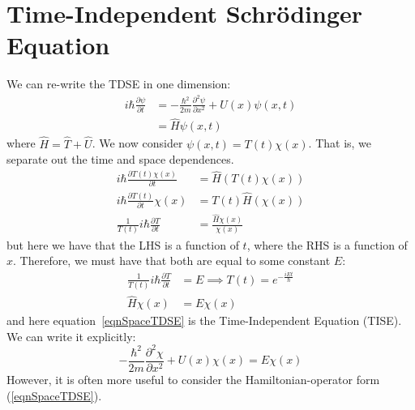 \documentclass[../Main.tex]{subfiles}
\begin{document}
\section{Time-Independent Schr\texorpdfstring{\"o}{o}dinger Equation}
We can re-write the TDSE in one dimension:
\begin{align*}
    i\hbar \frac{\partial \psi}{\partial t} &= -\frac{\hbar^2}{2m} \frac{\partial^{2}\psi}{\partial x^{2}} + U(x) \psi(x, t) \\
    &= \hat{H} \psi(x, t)
\end{align*}
where $\hat{H} = \hat{T} + \hat{U}$. We now consider $\psi(x, t) = T(t)\chi(x)$. That is, we separate out the time and space dependences.
\begin{align*}
    i\hbar \frac{\partial T(t)\chi(x)}{\partial t} &= \hat{H}(T(t)\chi(x)) \\
    i\hbar \frac{\partial T(t)}{\partial t}\chi(x) &= T(t)\hat{H}(\chi(x)) \\
    \frac{1}{T(t)} i\hbar \frac{\partial T}{\partial t} &= \frac{\hat{H} \chi(x)}{\chi(x)}
\end{align*}
but here we have that the LHS is a function of $t$, where the RHS is a function of $x$. Therefore, we must have that both are equal to some constant $E$:
\begin{align}
    \frac{1}{T(t)} i\hbar \frac{\partial T}{\partial t} &= E \implies T(t) = e^{-\frac{iEt}{\hbar}} \label{eqnTimeTDSE} \\
    \hat{H} \chi(x) &= E\chi(x) \label{eqnSpaceTDSE}
\end{align}
and here equation~\ref{eqnSpaceTDSE} is the Time-Independent \schr Equation (TISE). We can write it explicitly:
\begin{equation}
    -\frac{\hbar^2}{2m} \frac{\partial^{2}\chi}{\partial x^{2}} + U(x) \chi(x) = E\chi(x)
    \label{eqnTISE}
\end{equation}
However, it is often more useful to consider the Hamiltonian-operator form (\ref{eqnSpaceTDSE}).
\end{document}

